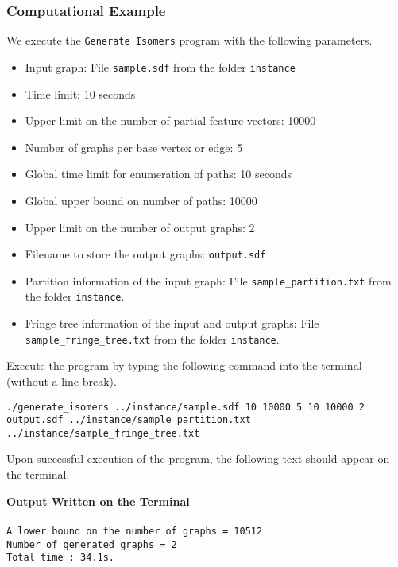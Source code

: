 \documentclass[11pt,titlepage,dvipdfmx,twoside]{article}
\begin{document}
\subsubsection{Computational Example}
\label{sec:instance_p}

We execute the {\tt Generate Isomers} program with the following parameters.

\begin{itemize}
\item Input graph: File {\tt sample.sdf} from the folder {\tt instance}
\item Time limit: 10 seconds
\item Upper limit on the number of partial feature vectors: 10000
\item Number of graphs per base vertex or edge: 5
\item Global time limit for enumeration of paths: 10 seconds
\item Global upper bound on number of paths: 10000
\item Upper limit on the number of output graphs: 2
\item Filename to store the output graphs: {\tt output.sdf}
\item Partition information of the input graph: 
File {\tt sample\_partition.txt} from the folder {\tt instance}.
\item Fringe tree information of the input and output graphs: 
File {\tt sample\_fringe\_tree.txt} from the folder {\tt instance}.
\end{itemize}

Execute the program by typing the following command into the terminal (without a line break).

\bigskip


{\tt ./generate\_isomers ../instance/sample.sdf 10 10000 5 10 10000 2} \\
 {\tt output.sdf ../instance/sample\_partition.txt }\\
 {\tt../instance/sample\_fringe\_tree.txt}
%
\bigskip

Upon successful execution of the program, the following text should appear on the terminal.

\begin{oframed}
{\bf Output Written on the Terminal}\\\\
{\tt A lower bound on the number of graphs = 10512\\
Number of generated graphs = 2\\
Total time : 34.1s.}
\end{oframed}
\end{document}
